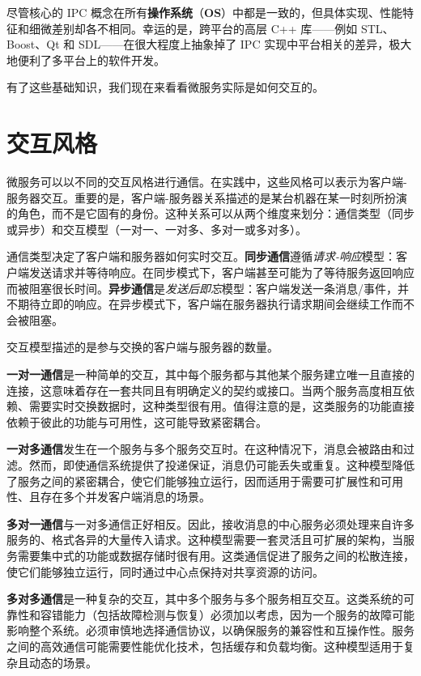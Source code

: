 \label{idx:1487}
尽管核心的 IPC 概念在所有\textbf{操作系统}（\textbf{OS}）中都是一致的，但具体实现、性能特征和细微差别却各不相同。幸运的是，跨平台的高层 C++ 库——例如 STL、Boost、Qt 和 SDL——在很大程度上抽象掉了 IPC 实现中平台相关的差异，极大地便利了多平台上的软件开发。

有了这些基础知识，我们现在来看看微服务实际是如何交互的。

\section{交互风格}

\label{idx:1488}
微服务可以以不同的交互风格进行通信。在实践中，这些风格可以表示为客户端-服务器交互。重要的是，客户端-服务器关系描述的是某台机器在某一时刻所扮演的角色，而不是它固有的身份。这种关系可以从两个维度来划分：通信类型（同步或异步）和交互模型（一对一、一对多、多对一或多对多）。

\label{idx:1489}
\label{idx:1490}
通信类型决定了客户端和服务器如何实时交互。\textbf{同步通信}遵循\emph{请求-响应}模型：客户端发送请求并等待响应。在同步模式下，客户端甚至可能为了等待服务返回响应而被阻塞很长时间。\textbf{异步通信}是\emph{发送后即忘}模型：客户端发送一条消息/事件，并不期待立即的响应。在异步模式下，客户端在服务器执行请求期间会继续工作而不会被阻塞。

交互模型描述的是参与交换的客户端与服务器的数量。


\label{idx:1491}
\label{idx:1492}
\textbf{一对一通信}是一种简单的交互，其中每个服务都与其他某个服务建立唯一且直接的连接，这意味着存在一套共同且有明确定义的契约或接口。当两个服务高度相互依赖、需要实时交换数据时，这种类型很有用。值得注意的是，这类服务的功能直接依赖于彼此的功能与可用性，这可能导致紧密耦合。

\label{idx:1493}
\label{idx:1494}
\textbf{一对多通信}发生在一个服务与多个服务交互时。在这种情况下，消息会被路由和过滤。然而，即使通信系统提供了投递保证，消息仍可能丢失或重复。这种模型降低了服务之间的紧密耦合，使它们能够独立运行，因而适用于需要可扩展性和可用性、且存在多个并发客户端消息的场景。

\label{idx:1495}
\label{idx:1496}
\textbf{多对一通信}与一对多通信正好相反。因此，接收消息的中心服务必须处理来自许多服务的、格式各异的大量传入请求。这种模型需要一套灵活且可扩展的架构，当服务需要集中式的功能或数据存储时很有用。这类通信促进了服务之间的松散连接，使它们能够独立运行，同时通过中心点保持对共享资源的访问。

\label{idx:1497}
\label{idx:1498}
\label{idx:1499}
\textbf{多对多通信}是一种复杂的交互，其中多个服务与多个服务相互交互。这类系统的可靠性和容错能力（包括故障检测与恢复）必须加以考虑，因为一个服务的故障可能影响整个系统。必须审慎地选择通信协议，以确保服务的兼容性和互操作性。服务之间的高效通信可能需要性能优化技术，包括缓存和负载均衡。这种模型适用于复杂且动态的场景。

